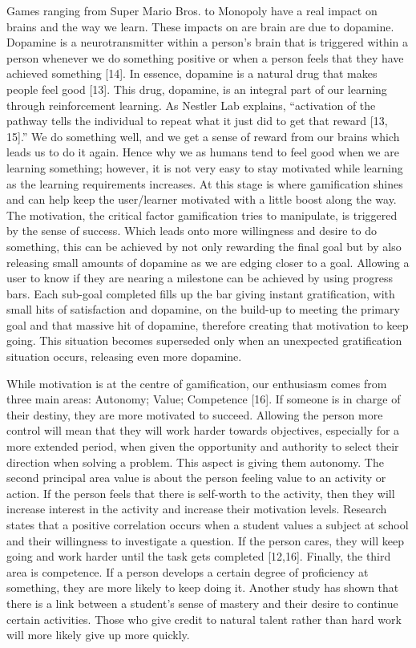 \documentclass{sigchi}
\begin{document}
Games ranging from Super Mario Bros. to Monopoly have a real impact on brains and the way we learn. These impacts on are brain are due to dopamine. Dopamine is a neurotransmitter within a person’s brain that is triggered within a person whenever we do something positive or when a person feels that they have achieved something [14]. In essence, dopamine is a natural drug that makes people feel good [13]. This drug, dopamine, is an integral part of our learning through reinforcement learning. As Nestler Lab explains, “activation of the pathway tells the individual to repeat what it just did to get that reward [13, 15].” We do something well, and we get a sense of reward from our brains which leads us to do it again. Hence why we as humans tend to feel good when we are learning something; however, it is not very easy to stay motivated while learning as the learning requirements increases. At this stage is where gamification shines and can help keep the user/learner motivated with a little boost along the way. The motivation, the critical factor gamification tries to manipulate, is triggered by the sense of success. Which leads onto more willingness and desire to do something, this can be achieved by not only rewarding the final goal but by also releasing small amounts of dopamine as we are edging closer to a goal. Allowing a user to know if they are nearing a milestone can be achieved by using progress bars. Each sub-goal completed fills up the bar giving instant gratification, with small hits of satisfaction and dopamine, on the build-up to meeting the primary goal and that massive hit of dopamine, therefore creating that motivation to keep going. This situation becomes superseded only when an unexpected gratification situation occurs, releasing even more dopamine. 

While motivation is at the centre of gamification, our enthusiasm comes from three main areas: Autonomy; Value; Competence [16]. If someone is in charge of their destiny, they are more motivated to succeed. Allowing the person more control will mean that they will work harder towards objectives, especially for a more extended period, when given the opportunity and authority to select their direction when solving a problem. This aspect is giving them autonomy. The second principal area value is about the person feeling value to an activity or action. If the person feels that there is self-worth to the activity, then they will increase interest in the activity and increase their motivation levels. Research states that a positive correlation occurs when a student values a subject at school and their willingness to investigate a question. If the person cares, they will keep going and work harder until the task gets completed [12,16]. Finally, the third area is competence. If a person develops a certain degree of proficiency at something, they are more likely to keep doing it. Another study has shown that there is a link between a student’s sense of mastery and their desire to continue certain activities. Those who give credit to natural talent rather than hard work will more likely give up more quickly. 
\end{document}
